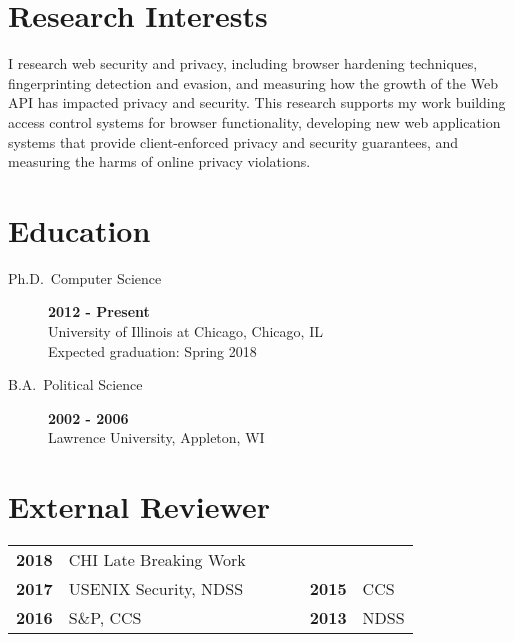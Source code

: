 \documentclass[wideaddress]{vitae}
\author{Peter Snyder}
\begin{document}
  \maketitle

  \section{Research Interests}
  \begin{description}
      \item{\noindent I research web security and privacy, including browser
          hardening techniques, fingerprinting detection and evasion,
          and measuring how the growth of the Web API has impacted privacy and security.
          This research supports my work building access control systems for
          browser functionality, developing new web application systems
          that provide client-enforced privacy and security guarantees,
          and measuring the harms of online privacy violations.}
  \end{description}

  \section{Education}
  \begin{description}
    \item[Ph.D.~Computer Science] \hfill \textbf{2012 - Present}\\
    University of Illinois at Chicago, Chicago, IL\\
    Expected graduation: Spring 2018

    \item[B.A.~Political Science] \hfill \textbf{2002 - 2006}~\\
    Lawrence University, Appleton, WI
  \end{description}

  
    \nocite{snyder2017browser}
    \nocite{snyder2017doxing}
    \nocite{snyder2017cdf}
    \nocite{snyder2016browser}
    \nocite{snyder2016characterizing}
    \nocite{snyder2016phishing}
    \nocite{snyder2015no}
    \nocite{clark2015saw}
    \nocite{snyder2014yao}
    \nocite{snyder2014cloudsweeper}
    \nocite{snyder2013cloudsweeper}
  

  \section{External Reviewer}
  \begin{tabular}{lllllll}
    \textbf{2018} & CHI Late Breaking Work \\
    \textbf{2017} & USENIX Security, NDSS &&&& \textbf{2015} & CCS \\
    \textbf{2016} & S\&P, CCS             &&&& \textbf{2013} & NDSS \\
  \end{tabular}
\end{document}
